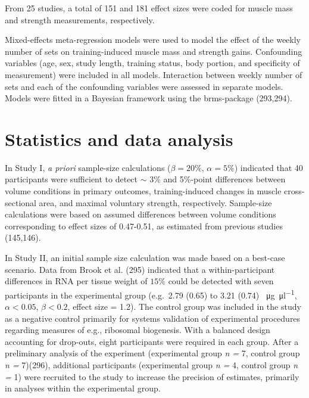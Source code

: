 \documentclass[twoside,10pt]{gihclass} %
\begin{document}
From 25 studies, a total of 151 and 181 effect sizes were coded for muscle mass and strength measurements, respectively.

Mixed-effects meta-regression models were used to model the effect of the weekly number of sets on training-induced muscle mass and strength gains.
Confounding variables (age, sex, study length, training status, body portion, and specificity of measurement) were included in all models. Interaction between weekly number of sets and each of the confounding variables were assessed in separate models.
Models were fitted in a Bayesian framework using the brms-package
(293,294).

\hypertarget{statistics-and-data-analysis}{%
\section{Statistics and data analysis}\label{statistics-and-data-analysis}}

In Study I, \emph{a priori} sample-size calculations (\(\beta=20\%\), \(\alpha=5\%\)) indicated that 40 participants were sufficient to detect \(\sim\) 3\% and 5\%-point differences between volume conditions in primary outcomes, training-induced changes in muscle cross-sectional area, and maximal voluntary strength, respectively. Sample-size calculations were based on assumed differences between volume conditions corresponding to effect sizes of 0.47-0.51, as estimated from previous studies (145,146).

In Study II, an initial sample size calculation was made based on a best-case scenario. Data from Brook et al. (295) indicated that a within-participant differences in RNA per tissue weight of \(15\%\) could be detected with seven participants in the experimental group (e.g.~2.79 (0.65) to 3.21 (0.74) \SI{}{\micro\gram\per\micro\litre}, \(\alpha<0.05\), \(\beta<0.2\), effect size = 1.2). The control group was included in the study as a negative control primarily for systems validation of experimental procedures regarding measures of e.g., ribosomal biogenesis. With a balanced design accounting for drop-outs, eight participants were required in each group. After a preliminary analysis of the experiment (experimental group \emph{n = }7, control group \emph{n = }7)(296), additional participants (experimental group \emph{n =} 4, control group \emph{n = }1) were recruited to the study to increase the precision of estimates, primarily in analyses within the experimental group.
\end{document}
